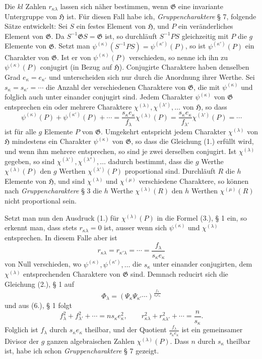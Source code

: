 \documentclass[11pt]{article}
\newcommand{\Hgr}{\mathfrak{H}}
\newcommand{\Ggr}{\mathfrak{G}}
\begin{document}
Die $kl$ Zahlen $r_{\kappa\lambda}$ lassen sich näher bestimmen, wenn $\Ggr$ eine invariante Untergruppe von $\Hgr$ ist. Für diesen Fall habe ich, \emph{Gruppencharaktere} § 7, folgende Sätze entwickelt: Sei $S$ ein festes Element von $\Hgr$, und $P$ ein veränderliches Element von $\Ggr$. Da $S^{-1}\Ggr S=\Ggr$ ist, so durchläuft $S^{-1}PS$ gleichzeitig mit $P$ die $g$ Elemente von $\Ggr$. Setzt man $\psi^{(\kappa)}(S^{-1}PS)=\psi^{(\kappa')}(P)$, so ist $\psi^{(\kappa')}(P)$ ein Charakter von $\Ggr$. Ist er von $\psi^{(\kappa)}(P)$ verschieden, so nenne ich ihn zu $\psi^{(\kappa)}(P)$ conjugirt (in Bezug auf $\Hgr$). Conjugirte Charaktere haben denselben Grad $e_\kappa=e_{\kappa'}$ und unterscheiden sich nur durch die Anordnung ihrer Werthe. Sei $s_\kappa=s_{\kappa'}=\cdots$ die Anzahl der verschiedenen Charaktere von $\Ggr$, die mit $\psi^{(\kappa)}$ und folglich auch unter einander conjugirt sind. Jedem Charakter $\psi^{(\kappa)}$ von $\Ggr$ entsprechen ein oder mehrere Charaktere $\chi^{(\lambda)},\chi^{(\lambda')},\ldots$ von $\Hgr$, so dass
\[
\tag{1.}
  \psi^{(\kappa)}(P)+\psi^{(\kappa')}(P)+\cdots
  =
  \frac{s_\kappa e_\kappa}{f_\lambda}\chi^{(\lambda)}(P)
  =
  \frac{s_\kappa e_\kappa}{f_{\lambda'}}\chi^{(\lambda')}(P)
  =\cdots
\]
ist für alle $g$ Elemente $P$ von $\Ggr$. Umgekehrt entspricht jedem Charakter $\chi^{(\lambda)}$ von $\Hgr$ mindestens ein Charakter $\psi^{(\kappa)}$ von $\Ggr$, so dass die Gleichung (1.) erfüllt wird, und wenn ihm mehrere entsprechen, so sind je zwei derselben conjugirt. Ist $\chi^{(\lambda)}$ gegeben, so sind $\chi^{(\lambda')},\chi^{(\lambda'')},\ldots$ dadurch bestimmt, dass die $g$ Werthe $\chi^{(\lambda)}(P)$ den $g$ Werthen $\chi^{(\lambda')}(P)$ proportional sind. Durchläuft $R$ die $h$ Elemente von $\Hgr$, und sind $\chi^{(\lambda)}$ und $\chi^{(\mu)}$ verschiedene Charaktere, so können nach \emph{Gruppencharaktere} § 3 die $h$ Werthe $\chi^{(\lambda)}(R)$ den $h$ Werthen $\chi^{(\mu)}(R)$ nicht proportional sein.

Setzt man nun den Ausdruck (1.) für $\chi^{(\lambda)}(P)$ in die Formel (3.), § 1 ein, so erkennt man, dass stets $r_{\kappa\lambda}=0$ ist, ausser wenn sich $\psi^{(\kappa)}$ und $\chi^{(\lambda)}$ entsprechen. In diesem Falle aber ist
\[
\tag{2.}
  r_{\kappa\lambda}=r_{\kappa'\lambda}=\cdots=\frac{f_\lambda}{s_\kappa e_\kappa}
\]
von Null verschieden, wo $\psi^{(\kappa)},\psi^{(\kappa')},\ldots$ die $s_\kappa$ unter einander conjugirten, dem $\chi^{(\lambda)}$ entsprechenden Charaktere von $\Ggr$ sind. Demnach reducirt sich die Gleichung (2.), § 1 auf
\[
\tag{3.}
  \Phi_\lambda=(\Psi_\kappa\Psi_{\kappa'}\cdots)^{\frac{f_\lambda}{s_\kappa e_\kappa}}
\]
und aus (6.), § 1 folgt
\[
\tag{4.}
  f_\lambda^2+f_{\lambda'}^2+\cdots=ns_\kappa e_\kappa^2,
  \qquad
  r_{\kappa\lambda}^2+r_{\kappa\lambda'}^2+\cdots=\frac{n}{s_\kappa}.
\]
Folglich ist $f_\lambda$ durch $s_\kappa e_\kappa$ theilbar, und der Quotient $\frac{f_\lambda}{s_\kappa e_\kappa}$ ist ein gemeinsamer Divisor der $g$ ganzen algebraischen Zahlen $\chi^{(\lambda)}(P)$. Dass $n$ durch $s_\kappa$ theilbar ist, habe ich schon \emph{Gruppencharaktere} § 7 gezeigt.
\end{document}
